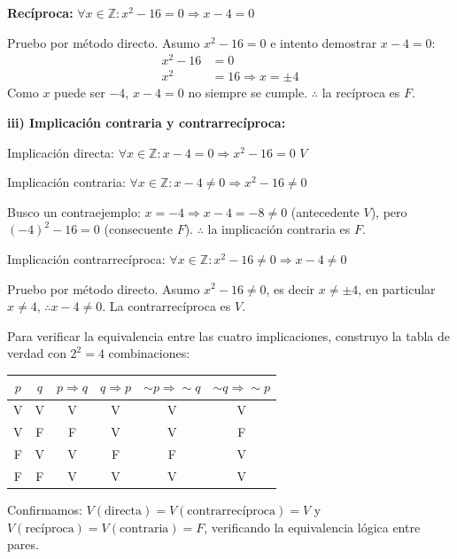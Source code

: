 \documentclass[12pt]{article}
\begin{document}
\begin{enumerate}[label=\alph*.-]
    \textbf{Recíproca:} $\forall x \in \mathbb{Z}: x^2 - 16 = 0 \Rightarrow x - 4 = 0$

    Pruebo por método directo. Asumo $x^2 - 16 = 0$ e intento demostrar $x - 4 = 0$:
    \begin{align*}
        x^2 - 16 &= 0 \\
        x^2 &= 16 \Rightarrow x = \pm 4
    \end{align*}
    Como $x$ puede ser $-4$, $x - 4 = 0$ no siempre se cumple. $\therefore$ la recíproca es $F$.

    \textbf{iii) Implicación contraria y contrarrecíproca:}

    Implicación directa: $\forall x \in \mathbb{Z}: x - 4 = 0 \Rightarrow x^2 - 16 = 0$ \quad $V$

    Implicación contraria: $\forall x \in \mathbb{Z}: x - 4 \neq 0 \Rightarrow x^2 - 16 \neq 0$

    Busco un contraejemplo: $x = -4 \Rightarrow x - 4 = -8 \neq 0$ (antecedente $V$), pero $(-4)^2 - 16 = 0$ (consecuente $F$). $\therefore$ la implicación contraria es $F$.

    Implicación contrarrecíproca: $\forall x \in \mathbb{Z}: x^2 - 16 \neq 0 \Rightarrow x - 4 \neq 0$

    Pruebo por método directo. Asumo $x^2 - 16 \neq 0$, es decir $x \neq \pm 4$, en particular $x \neq 4$, $\therefore x - 4 \neq 0$. La contrarrecíproca es $V$.

    Para verificar la equivalencia entre las cuatro implicaciones, construyo la tabla de verdad con $2^2 = 4$ combinaciones:

    \begin{center}
    \begin{tabular}{cc|c|c|c|c}
        \toprule
        $p$ & $q$ & $p \Rightarrow q$ & $q \Rightarrow p$ & $\sim p \Rightarrow \sim q$ & $\sim q \Rightarrow \sim p$ \\
        \midrule
        V & V & V & V & V & V \\
        V & F & F & V & V & F \\
        F & V & V & F & F & V \\
        F & F & V & V & V & V \\
        \bottomrule
    \end{tabular}
    \end{center}

    Confirmamos: $V(\text{directa}) = V(\text{contrarrecíproca}) = V$ y $V(\text{recíproca}) = V(\text{contraria}) = F$, verificando la equivalencia lógica entre pares.


\end{enumerate}
\end{document}
